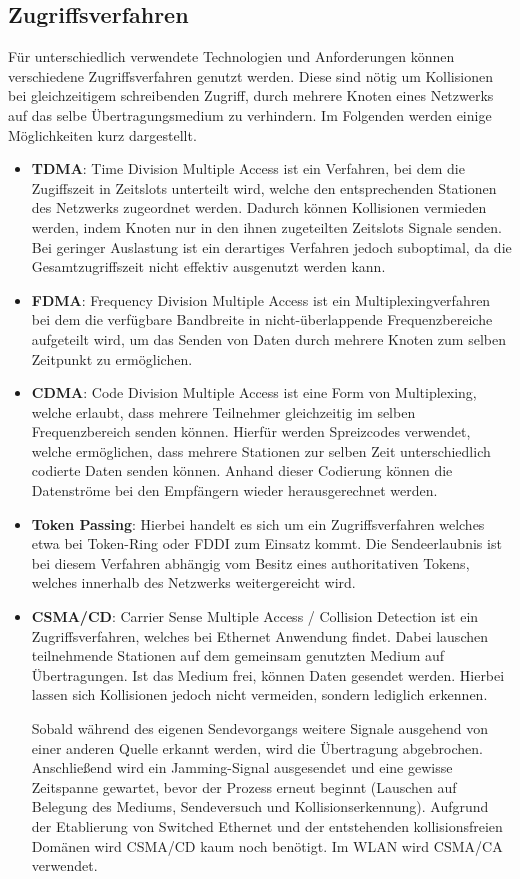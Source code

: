     \subsection{Zugriffsverfahren}
    Für unterschiedlich verwendete Technologien und Anforderungen können verschiedene Zugriffsverfahren genutzt werden. Diese sind nötig um Kollisionen bei gleichzeitigem
    schreibenden Zugriff, durch mehrere Knoten eines Netzwerks auf das selbe Übertragungsmedium zu verhindern. Im Folgenden werden einige Möglichkeiten kurz dargestellt.
        \begin{itemize}
            \item \textbf{TDMA}: Time Division Multiple Access ist ein Verfahren, bei dem die Zugiffszeit in Zeitslots unterteilt wird, welche den entsprechenden
            Stationen des Netzwerks zugeordnet werden. Dadurch können Kollisionen vermieden werden, indem Knoten nur in den ihnen zugeteilten Zeitslots Signale 
            senden. Bei geringer Auslastung ist ein derartiges Verfahren jedoch suboptimal, da die Gesamtzugriffszeit nicht effektiv ausgenutzt werden kann.
            \item \textbf{FDMA}: Frequency Division Multiple Access ist ein Multiplexingverfahren bei dem die verfügbare Bandbreite in nicht-überlappende Frequenzbereiche aufgeteilt wird,
            um das Senden von Daten durch mehrere Knoten zum selben Zeitpunkt zu ermöglichen.
            \item \textbf{CDMA}: Code Division Multiple Access ist eine Form von Multiplexing, welche erlaubt, dass mehrere Teilnehmer gleichzeitig im selben Frequenzbereich
            senden können. Hierfür werden Spreizcodes verwendet, welche ermöglichen, dass mehrere Stationen zur selben Zeit unterschiedlich codierte Daten senden können.
            Anhand dieser Codierung können die Datenströme bei den Empfängern wieder herausgerechnet werden.
            \item \textbf{Token Passing}: Hierbei handelt es sich um ein Zugriffsverfahren welches etwa bei Token-Ring oder FDDI zum Einsatz kommt. Die Sendeerlaubnis ist bei diesem
            Verfahren abhängig vom Besitz eines authoritativen Tokens, welches innerhalb des Netzwerks weitergereicht wird.
            \item \textbf{CSMA/CD}: Carrier Sense Multiple Access / Collision Detection ist ein Zugriffsverfahren, welches bei Ethernet Anwendung findet. Dabei lauschen teilnehmende Stationen
            auf dem gemeinsam genutzten Medium auf Übertragungen. Ist das Medium frei, können Daten gesendet werden. Hierbei lassen sich Kollisionen jedoch nicht vermeiden, sondern lediglich 
            erkennen. 
            
            Sobald während des eigenen Sendevorgangs weitere Signale ausgehend von einer anderen Quelle erkannt werden, wird die Übertragung abgebrochen. Anschließend wird ein
            Jamming-Signal ausgesendet und eine gewisse Zeitspanne gewartet, bevor der Prozess erneut beginnt (Lauschen auf Belegung des Mediums, Sendeversuch und Kollisionserkennung).
            Aufgrund der Etablierung von Switched Ethernet und der entstehenden kollisionsfreien Domänen wird CSMA/CD kaum noch benötigt. Im WLAN wird CSMA/CA verwendet.
        \end{itemize}

